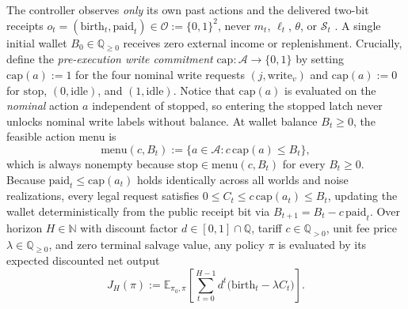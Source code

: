 \documentclass[11pt,a4paper]{article}
\newcounter{none}
\begin{document}
The controller observes \emph{only} its own past actions and the
delivered two-bit receipts
\(o_t = (\mathrm{birth}_t, \mathrm{paid}_t) \in \mathcal{O} := \{0,1\}^2\),
never \(m_t\), \(\ell_t\), \(\theta\), or \(\mathcal{S}_t\)
\citep{astrom1965, smallwoodSondik1973, krishnamurthy2016}. A single
initial wallet \(B_0 \in \mathbb{Q}_{\ge 0}\) receives zero external
income or replenishment. Crucially, define the \emph{pre-execution write
commitment} \(\mathrm{cap}: \mathcal{A} \to \{0,1\}\) by setting
\(\mathrm{cap}(a) := 1\) for the four nominal write requests
\((j, \mathrm{write}_v)\) and \(\mathrm{cap}(a) := 0\) for
\(\mathrm{stop}\), \((0, \mathrm{idle})\), and \((1, \mathrm{idle})\).
Notice that \(\mathrm{cap}(a)\) is evaluated on the \emph{nominal}
action \(a\) independent of \(\mathrm{stopped}\), so entering the
stopped latch never unlocks nominal write labels without balance. At
wallet balance \(B_t \ge 0\), the feasible action menu is
\[\mathrm{menu}(c, B_t) := \bigl\{a \in \mathcal{A} : c\,\mathrm{cap}(a) \le B_t\bigr\},\]
which is always nonempty because
\(\mathrm{stop} \in \mathrm{menu}(c, B_t)\) for every \(B_t \ge 0\).
Because \(\mathrm{paid}_t \le \mathrm{cap}(a_t)\) holds identically
across all worlds and noise realizations, every legal request satisfies
\(0 \le C_t \le c\,\mathrm{cap}(a_t) \le B_t\), updating the wallet
deterministically from the public receipt bit via
\(B_{t+1} = B_t - c\,\mathrm{paid}_t\). Over horizon
\(H \in \mathbb{N}\) with discount factor
\(d \in [0,1] \cap \mathbb{Q}\), tariff \(c \in \mathbb{Q}_{>0}\), unit
fee price \(\lambda \in \mathbb{Q}_{\ge 0}\), and zero terminal salvage
value, any policy \(\pi\) is evaluated by its expected discounted net
output
\[J_H(\pi) := \mathbb{E}_{\pi_0, \pi}\!\left[\sum_{t=0}^{H-1} d^t \bigl(\mathrm{birth}_t - \lambda C_t\bigr)\right].\]
\end{document}

